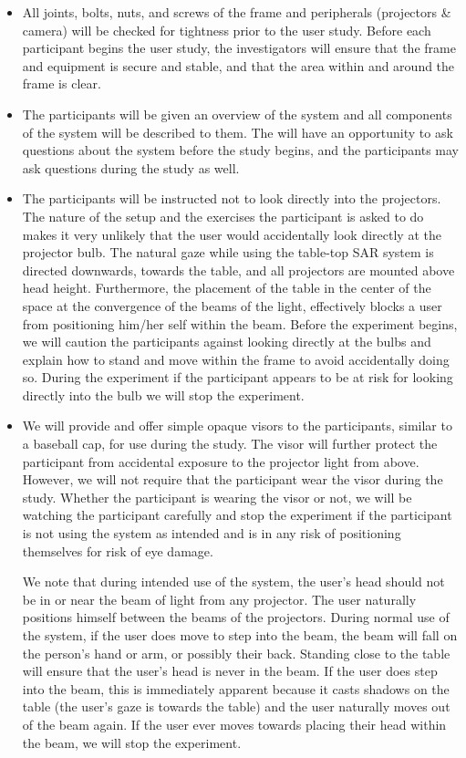 \documentclass[10pt]{article}
\begin{document}
\begin{itemize}

\item All joints, bolts, nuts, and screws of the frame and peripherals
  (projectors \& camera) will be checked for tightness prior to the
  user study.  Before each participant begins the user study, the
  investigators will ensure that the frame and equipment is secure and
  stable, and that the area within and around the frame is clear.

\item The participants will be given an overview of the system and all
  components of the system will be described to them.  The will have
  an opportunity to ask questions about the system before the study
  begins, and the participants may ask questions during the study as well.

\item The participants will be instructed not to look directly into
  the projectors.  The nature of the setup and the exercises the
  participant is asked to do makes it very unlikely that the user
  would accidentally look directly at the projector bulb.  The natural
  gaze while using the table-top SAR system is directed downwards,
  towards the table, and all projectors are mounted above head height.
  Furthermore, the placement of the table in the center of the space
  at the convergence of the beams of the light, effectively blocks a
  user from positioning him/her self within the beam.  Before the
  experiment begins, we will caution the participants against looking
  directly at the bulbs and explain how to stand and move within the
  frame to avoid accidentally doing so.  During the experiment if the
  participant appears to be at risk for looking directly into the bulb
  we will stop the experiment.

\item We will provide and offer simple opaque visors to the
  participants, similar to a baseball cap, for use during the study.
  The visor will further protect the participant from accidental
  exposure to the projector light from above.  However, we will not
  require that the participant wear the visor during the study.
  Whether the participant is wearing the visor or not, we will be
  watching the participant carefully and stop the experiment if the
  participant is not using the system as intended and is in any risk
  of positioning themselves for risk of eye damage.

  We note that during intended use of the system, the user's head
  should not be in or near the beam of light from any projector.  The
  user naturally positions himself between the beams of the
  projectors.  During normal use of the system, if the user does move
  to step into the beam, the beam will fall on the person's hand or
  arm, or possibly their back.  Standing close to the table will
  ensure that the user's head is never in the beam.  If the user does
  step into the beam, this is immediately apparent because it casts
  shadows on the table (the user's gaze is towards the table) and the
  user naturally moves out of the beam again.  If the user ever moves
  towards placing their head within the beam, we will stop the
  experiment.



\end{itemize}
\end{document}
